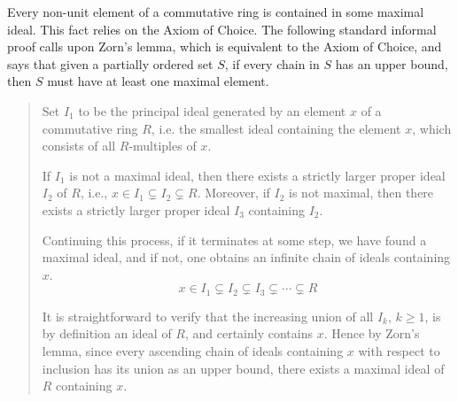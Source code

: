\documentclass{article}
\begin{document}
Every non-unit element of a commutative ring is contained in some maximal
ideal. This fact relies on the Axiom of Choice. The following standard informal
proof calls upon Zorn's lemma, which is equivalent to the Axiom of Choice, and
says that given a partially ordered set $S$, if every chain in $S$ has an upper
bound, then $S$ must have at least one maximal element. 

\begin{quote}
    Set \(I_{1}\) to be the principal ideal generated by an element \(x\) of a
    commutative ring $R$, i.e. the smallest ideal containing the element $x$,
    which consists of all $R$-multiples of $x$.
   
    If \(I_{1}\) is not a maximal ideal, then there exists a strictly larger
    proper ideal \(I_{2}\) of $R$, i.e.,
    $x\in I_{1}\subsetneq I_{2} \subsetneq R$. Moreover, if  \(I_{2}\) is not
    maximal, then there exists a strictly larger proper ideal
    $I_{3}$ containing $I_2$.
    
    Continuing this process, if it terminates at some step, we have found a
    maximal ideal, and if not, one obtains an infinite chain of ideals
    containing \(x\).
    \[x\in I_{1}\subsetneq I_{2}\subsetneq I_{3}\subsetneq\cdots\subsetneq R\]
    
    It is straightforward to verify that the increasing union of all $I_{k}$,
    $k \geq 1$, is by definition an ideal of $R$, and certainly
    contains \(x\).  Hence by Zorn's lemma, since every ascending chain of
    ideals containing $x$ with respect to inclusion has its union as an upper
    bound, there exists a maximal ideal of \(R\) containing \(x\).
\end{quote}
\end{document}
